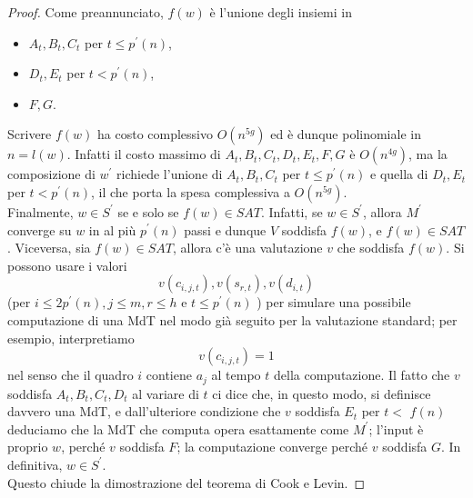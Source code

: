 \begin{proof}
    Come preannunciato, $f(w)$ è l'unione degli insiemi in
    \begin{itemize}
        \item $A_t, B_t, C_t$ per $t \leq p^{\prime}(n)$,
        \item $D_t, E_t$ per $t<p^{\prime}(n)$,
        \item $F, G$.
    \end{itemize}
    Scrivere $f(w)$ ha costo complessivo $O\left(n^{5 g}\right)$ ed è dunque
    polinomiale in $n=l(w)$. Infatti il costo massimo di $A_t, B_t, C_t, D_t,
        E_t, F, G$ è $O\left(n^{4 g}\right)$, ma la composizione di $w^{\prime}$
    richiede l'unione di $A_t, B_t, C_t$ per $t \leq p^{\prime}(n)$ e quella di
    $D_t, E_t$ per $t<p^{\prime}(n)$, il che porta la spesa complessiva a
    $O\left(n^{5 g}\right)$.\\
    Finalmente, $w \in S^{\prime}$ se e solo se $f(w) \in S A T$. Infatti, se $w
        \in S^{\prime}$, allora $M^{\prime}$ converge su $w$ in al più
    $p^{\prime}(n)$ passi e dunque $V$ soddisfa $f(w)$, e $f(w) \in S A T$.
    Viceversa, sia $f(w) \in S A T$, allora c'è una valutazione $v$ che soddisfa
    $f(w)$. Si possono usare i valori
    $$
        v\left(c_{i, j, t}\right), v\left(s_{r, t}\right), v\left(d_{i, t}\right)
    $$
    (per $i \leq 2 p^{\prime}(n), j \leq m, r \leq h$ e $t \leq p^{\prime}(n)$ )
    per simulare una possibile computazione di una MdT nel modo già seguito per
    la valutazione standard; per esempio, interpretiamo
    $$
        v\left(c_{i, j, t}\right)=1
    $$
    nel senso che il quadro $i$ contiene $a_j$ al tempo $t$ della computazione.
    Il fatto che $v$ soddisfa $A_t, B_t, C_t, D_t$ al variare di $t$ ci dice
    che, in questo modo, si definisce davvero una MdT, e dall'ulteriore
    condizione che $v$ soddisfa $E_t$ per $t<$ $f(n)$ deduciamo che la MdT che
    computa opera esattamente come $M^{\prime}$; l'input è proprio $w$, perché
    $v$ soddisfa $F$; la computazione converge perché $v$ soddisfa $G$. In
    definitiva, $w \in S^{\prime}$.\\
    Questo chiude la dimostrazione del teorema di Cook e Levin.
\end{proof}